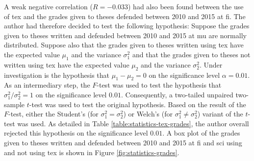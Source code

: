 A weak negative correlation ($R=-0.033$) had also been found between the use of \gls{tex} and the grades given to theses defended between 2010 and 2015 at \gls{fi}. The author had therefore decided to test the following \gls{hypothesis}: Suppose the grades given to theses written and defended between 2010 and 2015 at \gls{mu} are normally distributed. Suppose also that the grades given to theses written using \gls{tex} have the expected value $\mu_1$ and the variance $\sigma_1^2$ and that the grades given to theses not written using \gls{tex} have the expected value $\mu_2$ and the variance $\sigma_2^2$. Under investigation is the \gls{hypothesis} that $\mu_1-\mu_2=0$ on the significance level $\alpha=0.01$. As an intermediary step, the $F$-test was used to test the \gls{hypothesis} that $\sigma_1^2/\sigma_2^2=1$ on the significance level $0.01$. Consequently, a two-tailed unpaired two-sample $t$-test was used to test the original \gls{hypothesis}. Based on the result of the $F$-test, either the Student's (for $\sigma_1^2=\sigma_2^2$) or Welch's \cite{WELCH01011947} (for $\sigma_1^2\not=\sigma_2^2$) variant of the $t$-test was used. As detailed in Table \ref{table:statistics-tex-grades}, the author overall rejected this \gls{hypothesis} on the significance level $0.01$. A box plot of the grades given to theses written and defended between 2010 and 2015 at \gls{fi} and \gls{sci} using and not using \gls{tex} is shown in Figure \ref{fig:statistics-grades}.
